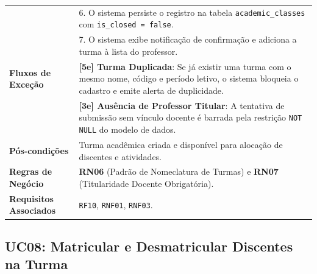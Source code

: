 \begin{table}[!ht]
\begin{tabularx}{\textwidth}{p{3.5cm} X}
& 6. O sistema persiste o registro na tabela \texttt{academic\_classes} com \texttt{is\_closed = false}.\\
& 7. O sistema exibe notificação de confirmação e adiciona a turma à lista do professor. \\
\textbf{Fluxos de Exceção} & 
\textbf{[5e] Turma Duplicada}: Se já existir uma turma com o mesmo nome, código e período letivo, o sistema bloqueia o cadastro e emite alerta de duplicidade.\\
& \textbf{[3e] Ausência de Professor Titular}: A tentativa de submissão sem vínculo docente é barrada pela restrição \texttt{NOT NULL} do modelo de dados. \\
\textbf{Pós-condições} & Turma acadêmica criada e disponível para alocação de discentes e atividades. \\
\textbf{Regras de Negócio} & \textbf{RN06} (Padrão de Nomeclatura de Turmas) e \textbf{RN07} (Titularidade Docente Obrigatória). \\
\textbf{Requisitos Associados} & \texttt{RF10}, \texttt{RNF01}, \texttt{RNF03}. \\
\bottomrule
\end{tabularx}
\end{table}

\subsection{UC08: Matricular e Desmatricular Discentes na Turma}
\label{uc08_especificacao}

